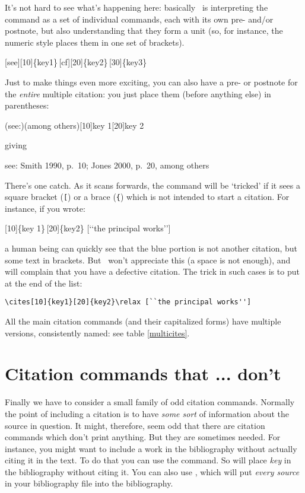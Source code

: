 It's not hard to see what's happening here: basically \biblatex\ is
interpreting the command as a set of individual  commands,
each with its own pre- and/or postnote, but also understanding that
they form a unit (so, for instance, the numeric style places them in
one set of brackets).
\begin{center}
\ttfamily
{}\colorbox{red!30}{[see][10]\{key1\}}\,\colorbox{green!30}{[cf][20]\{key2\}}\,\colorbox{blue!30}{[30]\{key3\}}
\end{center}

Just to make things even more exciting, you can also have a pre- or
postnote for the \emph{entire} multiple citation: you just place them
(before anything else) in parentheses:
\begin{center}
\ttfamily
{}(see:)(among others)[10]{key 1}[20]{key 2}
\end{center}
giving
\begin{center}
see: Smith 1990, p.\ 10; Jones 2000, p.\ 20, among others
\end{center}

There's one catch. As it scans forwards, the  command will
be `tricked' if it sees a square bracket (\texttt[) or a brace
(\texttt\{) which is not intended to start a citation. For instance,
if you wrote:
\begin{center}
\ttfamily
{}\colorbox{red!30}{[10]\{key
  1\}}\,\colorbox{green!30}{[20]\{key2\}}
\colorbox{blue!30}{[`{}`the principal works'{}']}
\end{center}
a human being can quickly see that the blue portion is not another
citation, but some text in brackets. But \biblatex\ won't appreciate
this (a space is not enough), and will complain that you have a
defective citation. The trick in such cases is to put  at
the end of the list:
\begin{center}
\verb|\cites[10]{key1}[20]{key2}\relax [``the principal works'']|
\end{center}

All the main citation commands (and their capitalized forms) have
multiple versions, consistently named: see table \ref{multicites}.

\section{Citation commands that ... don't}

Finally we have to consider a small family of odd citation
commands. Normally the point of including a citation is to have
\emph{some sort} of information about the source in question. It
might, therefore, seem odd that there are citation commands which
don't print anything. But they are sometimes needed. For instance, you
might want to include a work in the bibliography without actually
citing it in the text. To do that you can use the 
command. So  will place \emph{key} in the
bibliography without citing it. You can also use ,
which will put \emph{every source} in your bibliography file into the
bibliography.

